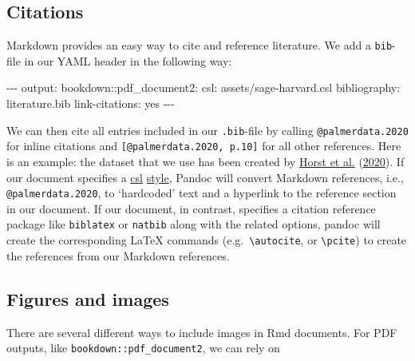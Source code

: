 \documentclass[
  11pt,
]{scrartcl}
\newenvironment{Shaded}{\begin{snugshade}}{\end{snugshade}}
\newcommand{\NormalTok}[1]{#1}
\newcommand{\SpecialCharTok}[1]{\textcolor[rgb]{0.00,0.00,0.00}{#1}}
\newcommand{\StringTok}[1]{\textcolor[rgb]{0.31,0.60,0.02}{#1}}
\begin{document}
\hypertarget{citations}{%
\subsection{Citations}\label{citations}}

Markdown provides an easy way to cite and reference literature. We add a \texttt{bib}-file in our YAML header in the following way:

\begin{Shaded}
\begin{Highlighting}[]
\SpecialCharTok{{-}{-}{-}}
\NormalTok{output}\SpecialCharTok{:}
\NormalTok{  bookdown}\SpecialCharTok{::}\NormalTok{pdf\_document2}\SpecialCharTok{:}
\NormalTok{csl}\SpecialCharTok{:} \StringTok{\textquotesingle{}assets/sage{-}harvard.csl\textquotesingle{}} 
\NormalTok{bibliography}\SpecialCharTok{:}\NormalTok{ literature.bib  }
\NormalTok{link}\SpecialCharTok{{-}}\NormalTok{citations}\SpecialCharTok{:}\NormalTok{ yes }
\SpecialCharTok{{-}{-}{-}}
\end{Highlighting}
\end{Shaded}

We can then cite all entries included in our \texttt{.bib}-file by calling \texttt{@palmerdata.2020} for inline citations and \texttt{{[}@palmerdata.2020,\ p.10{]}} for all other references. Here is an example: the dataset that we use has been created by \protect\hyperlink{ref-palmerdata.2020}{Horst et al.} (\protect\hyperlink{ref-palmerdata.2020}{2020}). If our document specifies a \href{https://citationstyles.org/}{csl} \href{https://www.zotero.org/styles}{style}, Pandoc will convert Markdown references, i.e., \texttt{@palmerdata.2020}, to `hardcoded' text and a hyperlink to the reference section in our document. If our document, in contrast, specifies a citation reference package like \texttt{biblatex} or \texttt{natbib} along with the related options, pandoc will create the corresponding LaTeX commands (e.g.~\texttt{\textbackslash{}autocite}, or \texttt{\textbackslash{}pcite}) to create the references from our Markdown references.

\hypertarget{figures-and-images}{%
\subsection{Figures and images}\label{figures-and-images}}

There are several different ways to include images in Rmd documents. For PDF outputs, like \texttt{bookdown::pdf\_document2}, we can rely on
\end{document}
